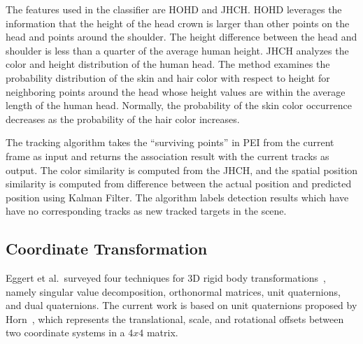 The features used in the classifier are HOHD and JHCH. HOHD leverages the information that the height of the head crown is larger than other points on the head and points around the shoulder. The height difference between the head and shoulder is less than a quarter of the average human height. JHCH analyzes the color and height distribution of the human head. The method examines the probability distribution of the skin and hair color with respect to height for neighboring points around the head whose height values are within the average length of the human head. Normally, the probability of the skin color occurrence decreases as the probability of the hair color increases.

The tracking algorithm takes the ``surviving points'' in PEI from the current frame as input and returns the association result with the current tracks as output. The color similarity is computed from the JHCH, and the spatial position similarity is computed from difference between the actual position and predicted position using Kalman Filter. The algorithm labels detection results which have have no corresponding tracks as new tracked targets in the scene.



\subsection{Coordinate Transformation}

Eggert et al.\ surveyed four techniques for 3D rigid body transformations~\cite{eggert_four_algorithms}, namely singular value decomposition, orthonormal matrices, unit quaternions, and dual quaternions. The current work is based on unit quaternions proposed by Horn~\cite{horn_unit_quaternions}, which represents the translational, scale, and rotational offsets between two coordinate systems in a $4x4$ matrix.


